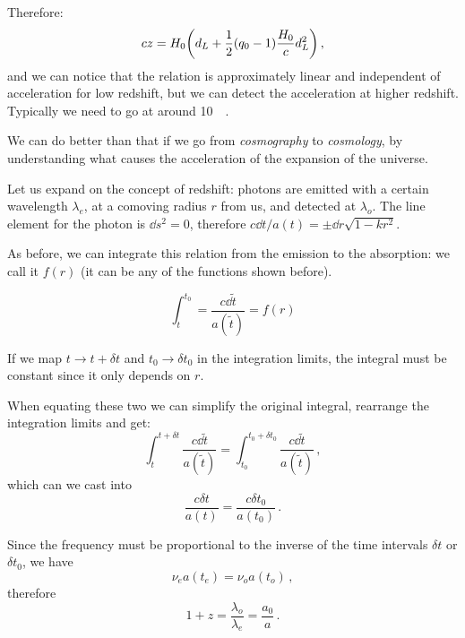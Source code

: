 \documentclass[main.tex]{subfiles}
\begin{document}
Therefore:
\begin{equation}
  cz = H_0 \qty(d_L + \frac{1}{2} (q_0 -1 ) \frac{H_0}{c} d_L^2)\,,
\end{equation}
%
and we can notice that the relation is approximately linear and independent of acceleration for low redshift, but we can detect the acceleration at higher redshift.
Typically we need to go at around \SI{10}{\mega\parsec}.


We can do better than that if we go from \emph{cosmography} to \emph{cosmology}, by understanding what causes the acceleration of the expansion of the universe.

Let us expand on the concept of redshift:
photons are emitted with a certain wavelength \(\lambda_{e}\), at a comoving radius \(r\) from us, and detected at \(\lambda_{o}\).
The line element for the photon is \(\dd{s^2} =0\), therefore \(c\dd{t}/ a(t) = \pm \dd{r} \sqrt{1-kr^2} \).

As before, we can integrate this relation from the emission to the absorption: we call it \(f(r)\) (it can be any of the functions shown before).

\begin{equation}
  \int_{t}^{t_0 } = \frac{c\dd{\widetilde{t}}}{a(\widetilde{t})} = f(r)
\end{equation}

If we map \(t \rightarrow t + \delta t\) and \(t_0 \rightarrow \delta t_0 \) in the integration limits, the integral must be constant since it only depends on \(r\).

When equating these two we can simplify the original integral, rearrange the integration limits and get:
\begin{equation}
  \int_{t}^{t + \delta t} \frac{c\dd{\widetilde{t}}}{a(\widetilde{t})} = \int_{t_0 }^{t_0 + \delta t_0 } \frac{c\dd{\widetilde{t}}}{a(\widetilde{t})}\,,
\end{equation}
%
which can we cast into
\begin{equation}
  \frac{c \delta t}{a(t)} =   \frac{c \delta t_0 }{a(t_0 )}\,.
\end{equation}

Since the frequency must be proportional to the inverse of the time intervals \(\delta t\) or \(\delta t_0 \), we have
\begin{equation}
  \nu_{e} a(t_{e}) = \nu_{o} a(t_{o})\,,
\end{equation}
%
therefore 
%
\begin{equation}
  1 + z = \frac{\lambda_{o}}{\lambda_{e}}
  = \frac{a_0 }{a}\,.
\end{equation}
\end{document}
